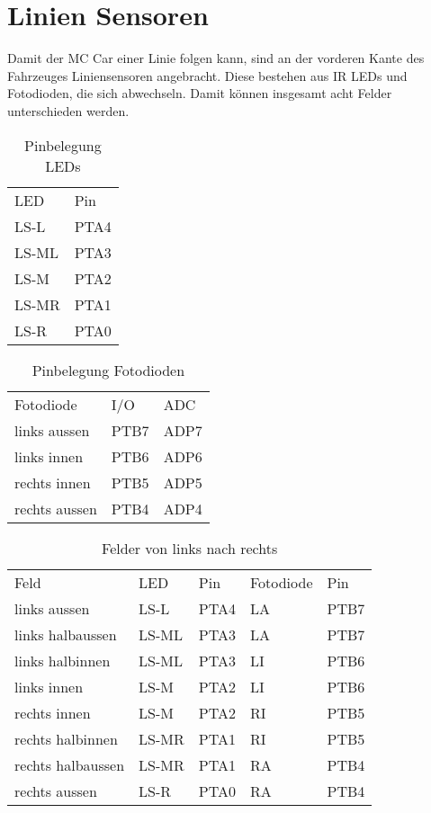 \documentclass[a4paper,10pt,fleqn]{article}
\begin{document}
\section{Linien Sensoren}
Damit der MC Car einer Linie folgen kann, sind an der vorderen Kante des 
Fahrzeuges Liniensensoren angebracht. Diese bestehen aus IR LEDs und 
Fotodioden, die sich abwechseln. Damit können insgesamt acht Felder 
unterschieden werden. 
\begin{table}[h!]
\begin{tabular}{ll}
\rowcolor{white} LED    & Pin   \\
\rowcolor{lgray} LS-L   & PTA4  \\
\rowcolor{white} LS-ML  & PTA3  \\
\rowcolor{lgray} LS-M   & PTA2  \\
\rowcolor{white} LS-MR  & PTA1  \\
\rowcolor{lgray} LS-R   & PTA0  \\
\end{tabular}
\caption{Pinbelegung LEDs}
\end{table}
\begin{table}[h!]
\begin{tabular}{lll}
\rowcolor{white} Fotodiode      & I/O   & ADC   \\
\rowcolor{lgray} links aussen   & PTB7  & ADP7  \\
\rowcolor{white} links innen    & PTB6  & ADP6  \\
\rowcolor{lgray} rechts innen   & PTB5  & ADP5  \\
\rowcolor{white} rechts aussen  & PTB4  & ADP4  \\
\end{tabular}
\caption{Pinbelegung Fotodioden}
\end{table}
\begin{table}[h!]
\begin{tabular}{lllll}
\rowcolor{white} Feld               & LED   & Pin   & Fotodiode & Pin   \\
\rowcolor{lgray} links aussen       & LS-L  & PTA4  & LA        & PTB7  \\
\rowcolor{white} links halbaussen   & LS-ML & PTA3  & LA        & PTB7  \\
\rowcolor{lgray} links halbinnen    & LS-ML & PTA3  & LI        & PTB6  \\
\rowcolor{white} links innen        & LS-M  & PTA2  & LI        & PTB6  \\
\rowcolor{lgray} rechts innen       & LS-M  & PTA2  & RI        & PTB5  \\
\rowcolor{white} rechts halbinnen   & LS-MR & PTA1  & RI        & PTB5  \\
\rowcolor{lgray} rechts halbaussen  & LS-MR & PTA1  & RA        & PTB4  \\
\rowcolor{white} rechts aussen      & LS-R  & PTA0  & RA        & PTB4  \\
\end{tabular}
\caption{Felder von links nach rechts}
\end{table}
\end{document}
